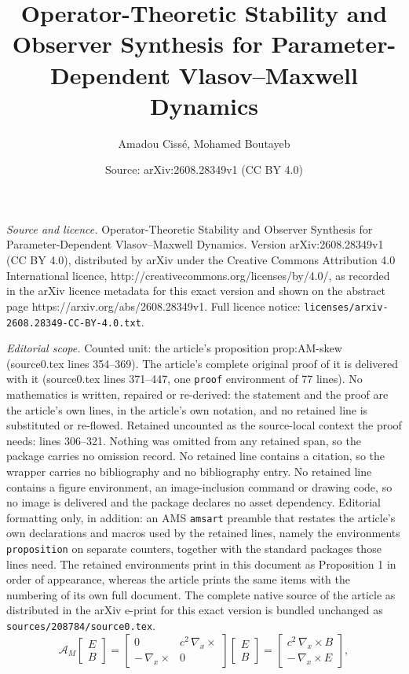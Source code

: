 \documentclass[10pt,a4paper]{amsart}
\title{Operator-Theoretic Stability and Observer Synthesis for Parameter-Dependent Vlasov--Maxwell Dynamics}
\author{Amadou Ciss\'e, Mohamed Boutayeb}
\date{Source: arXiv:2608.28349v1 (CC BY 4.0)}
\begin{document}
\maketitle

\noindent\emph{Source and licence.} Operator-Theoretic Stability and Observer Synthesis for Parameter-Dependent Vlasov--Maxwell Dynamics. Version arXiv:2608.28349v1 (CC BY 4.0), distributed by arXiv under the Creative Commons Attribution 4.0 International licence, http://creativecommons.org/licenses/by/4.0/, as recorded in the arXiv licence metadata for this exact version and shown on the abstract page https://arxiv.org/abs/2608.28349v1. Full licence notice: \texttt{licenses/arxiv-2608.28349-CC-BY-4.0.txt}.\par\smallskip

\noindent\textit{Editorial scope.} Counted unit: the article's proposition prop:AM-skew (source0.tex lines 354--369). The article's complete original proof of it is delivered with it (source0.tex lines 371--447, one \texttt{proof} environment of 77 lines). No mathematics is written, repaired or re-derived: the statement and the proof are the article's own lines, in the article's own notation, and no retained line is substituted or re-flowed.  Retained uncounted as the source-local context the proof needs: lines 306--321.  Nothing was omitted from any retained span, so the package carries no omission record.  No retained line contains a citation, so the wrapper carries no bibliography and no bibliography entry.  No retained line contains a figure environment, an image-inclusion command or drawing code, so no image is delivered and the package declares no asset dependency.  Editorial formatting only, in addition: an AMS \texttt{amsart} preamble that restates the article's own declarations and macros used by the retained lines, namely the environments \texttt{proposition} on separate counters, together with the standard packages those lines need.  The retained environments print in this document as Proposition 1 in order of appearance, whereas the article prints the same items with the numbering of its own full document.  The complete native source of the article as distributed in the arXiv e-print for this exact version is bundled unchanged as \texttt{sources/208784/source0.tex}.
\begin{equation}\label{eq:A_M}
\mathcal{A}_M
\begin{bmatrix} E \\[0.2em] B \end{bmatrix}
=
\begin{bmatrix}
0 & c^{2}\,\nabla_x \!\times \\[0.3em]
-\,\nabla_x \!\times & 0
\end{bmatrix}
\begin{bmatrix} E \\[0.2em] B \end{bmatrix}
=
\begin{bmatrix}
c^{2}\,\nabla_x \!\times B \\[0.3em]
-\,\nabla_x \!\times E
\end{bmatrix},
\end{equation}
\end{document}
